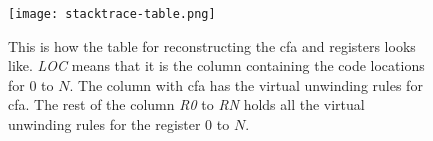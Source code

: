 


\begin{figure}[h]
	\centering
	\texttt{[image: stacktrace-table.png]}
	\caption{This is how the table for reconstructing the \gls{cfa} and registers looks like. \emph{LOC} means that it is the column containing the code locations for $0$ to $N$. The column with \gls{cfa} has the virtual unwinding rules for \gls{cfa}. The rest of the column \emph{R0} to \emph{RN} holds all the virtual unwinding rules for the register $0$ to $N$.}
	\label{fig:stacktracetable}
\end{figure}

%
%
%
%
%
%
